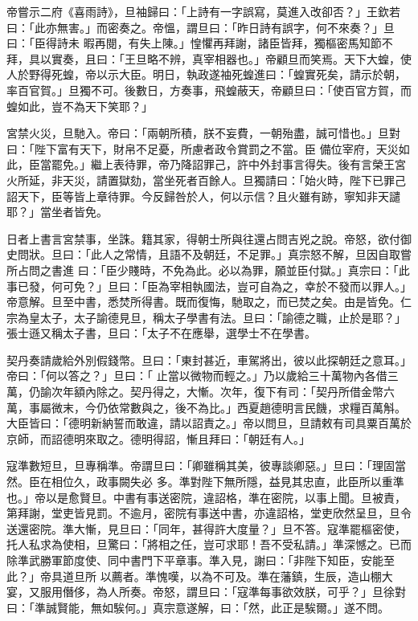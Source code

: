 \begin{pinyinscope}
 帝嘗示二府《喜雨詩》，旦袖歸曰：「上詩有一字誤寫，莫進入改卻否？」王欽若曰：「此亦無害。」而密奏之。帝慍，謂旦曰：「昨日詩有誤字，何不來奏？」旦曰：「臣得詩未
 暇再閱，有失上陳。」惶懼再拜謝，諸臣皆拜，獨樞密馬知節不拜，具以實奏，且曰：「王旦略不辨，真宰相器也。」帝顧旦而笑焉。天下大蝗，使人於野得死蝗，帝以示大臣。明日，執政遂袖死蝗進曰：「蝗實死矣，請示於朝，率百官賀。」旦獨不可。後數日，方奏事，飛蝗蔽天，帝顧旦曰：「使百官方賀，而蝗如此，豈不為天下笑耶？」



 宮禁火災，旦馳入。帝曰：「兩朝所積，朕不妄費，一朝殆盡，誠可惜也。」旦對曰：「陛下富有天下，財帛不足憂，所慮者政令賞罰之不當。臣
 備位宰府，天災如此，臣當罷免。」繼上表待罪，帝乃降詔罪己，許中外封事言得失。後有言榮王宮火所延，非天災，請置獄劾，當坐死者百餘人。旦獨請曰：「始火時，陛下已罪己詔天下，臣等皆上章待罪。今反歸咎於人，何以示信？且火雖有跡，寧知非天譴耶？」當坐者皆免。



 日者上書言宮禁事，坐誅。籍其家，得朝士所與往還占問吉兇之說。帝怒，欲付御史問狀。旦曰：「此人之常情，且語不及朝廷，不足罪。」真宗怒不解，旦因自取嘗所占問之書進
 曰：「臣少賤時，不免為此。必以為罪，願並臣付獄。」真宗曰：「此事已發，何可免？」旦曰：「臣為宰相執國法，豈可自為之，幸於不發而以罪人。」帝意解。旦至中書，悉焚所得書。既而復悔，馳取之，而已焚之矣。由是皆免。仁宗為皇太子，太子諭德見旦，稱太子學書有法。旦曰：「諭德之職，止於是耶？」張士遜又稱太子書，旦曰：「太子不在應舉，選學士不在學書。



 契丹奏請歲給外別假錢幣。旦曰：「東封甚近，車駕將出，彼以此探朝廷之意耳。」帝曰：「何以答之？」旦曰：「
 止當以微物而輕之。」乃以歲給三十萬物內各借三萬，仍諭次年額內除之。契丹得之，大慚。次年，復下有司：「契丹所借金幣六萬，事屬微末，今仍依常數與之，後不為比。」西夏趙德明言民饑，求糧百萬斛。大臣皆曰：「德明新納誓而敢違，請以詔責之。」帝以問旦，旦請敕有司具粟百萬於京師，而詔德明來取之。德明得詔，慚且拜曰：「朝廷有人。」



 寇準數短旦，旦專稱準。帝謂旦曰：「卿雖稱其美，彼專談卿惡。」旦曰：「理固當然。臣在相位久，政事闕失必
 多。準對陛下無所隱，益見其忠直，此臣所以重準也。」帝以是愈賢旦。中書有事送密院，違詔格，準在密院，以事上聞。旦被責，第拜謝，堂吏皆見罰。不逾月，密院有事送中書，亦違詔格，堂吏欣然呈旦，旦令送還密院。準大慚，見旦曰：「同年，甚得許大度量？」旦不答。寇準罷樞密使，托人私求為使相，旦驚曰：「將相之任，豈可求耶！吾不受私請。」準深憾之。已而除準武勝軍節度使、同中書門下平章事。準入見，謝曰：「非陛下知臣，安能至此？」帝具道旦所
 以薦者。準愧嘆，以為不可及。準在藩鎮，生辰，造山棚大宴，又服用僭侈，為人所奏。帝怒，謂旦曰：「寇準每事欲效朕，可乎？」旦徐對曰：「準誠賢能，無如騃何。」真宗意遂解，曰：「然，此正是騃爾。」遂不問。




\end{pinyinscope}
